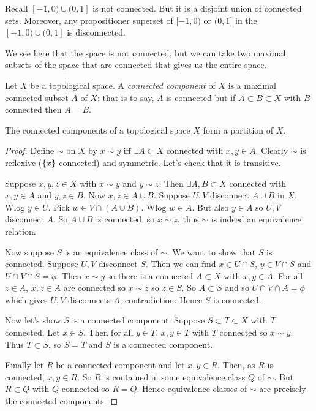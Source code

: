 \begin{example}
Recall $[-1,0)\cup (0,1]$ is not connected. But it is a disjoint union of connected sets. Moreover, any propositioner superset of $[-1,0)$ or $(0,1]$ in the $[-1,0)\cup (0,1]$ is disconnected. 

We see here that the space is not connected, but we can take two maximal subsets of the space that are connected that gives us the entire space.
\end{example}

\begin{definition}
Let $X$ be a topological space. A \emph{connected component} of $X$ is a maximal connected subset $A$ of $X$: that is to say, $A$ is connected but if $A\subset B\subset X$ with $B$ connected then $A=B$.
\end{definition}

\begin{theorem} \label{thm:45}
The connected components of a topological space $X$ form a partition of $X$.
\end{theorem}
\begin{proof}
Define $\sim$ on $X$ by $x\sim y$ iff $\exists A\subset X$ connected with $x,y\in A$. Clearly $\sim$ is reflexive ($\{x\}$ connected) and symmetric. Let's check that it is transitive.

Suppose $x,y,z\in X$ with $x\sim y$ and $y\sim z$. Then $\exists A,B\subset X$ connected with $x,y\in A$ and $y,z\in B$. Now $x,z\in A\cup B$. Suppose $U,V$ disconnect $A\cup B$ in $X$. Wlog $y\in U$. Pick $w\in V\cap(A\cup B)$. Wlog $w\in A$. But also $y\in A$ so $U,V$ disconnect $A$. So $A\cup B$ is connected, so $x\sim z$, thus $\sim$ is indeed an equivalence relation.

Now suppose $S$ is an equivalence class of $\sim$. We want to show that $S$ is connected. Suppose $U,V$ disconnect $S$. Then we can find $x\in U\cap S$, $y\in V\cap S$ and $U\cap V\cap S = \phi$. Then $x\sim y$ so there is a connected $A\subset X$ with $x,y\in A$. For all $z\in A$, $x,z\in A$ are connected so $x\sim z$ so $z\in S$. So $A\subset S$ and so $U\cap V\cap A = \phi$ which gives $U,V$ disconnects $A$, contradiction. Hence $S$ is connected.

Now let's show $S$ is a connected component. Suppose $S\subset T\subset X$ with $T$ connected. Let $x\in S$. Then for all $y\in T$, $x,y\in T$ with $T$ connected so $x\sim y$. Thus $T\subset S$, so $S=T$ and $S$ is a connected component.

Finally let $R$ be a connected component and let $x,y\in R$. Then, as $R$ is connected, $x,y\in R$. So $R$ is contained in some equivalence class $Q$ of $\sim$. But $R\subset Q$ with $Q$ connected so $R=Q$. Hence equivalence classes of $\sim$ are precisely the connected components.
\end{proof}

